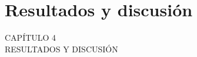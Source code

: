 
{

\Hide
\chapter{Resultados y discusión}
}

\begin{titular} 
	\uppercase{
	capítulo 4 \\
	Resultados y discusión \\
	}
\end{titular}

